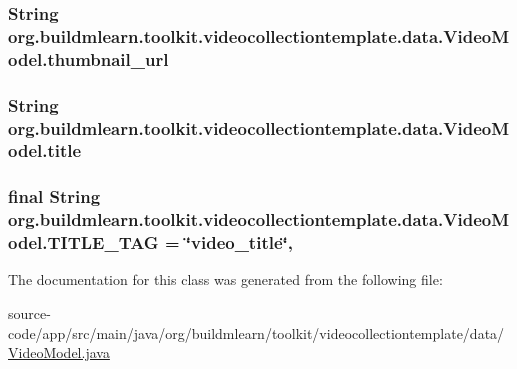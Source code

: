 \subsubsection[{\texorpdfstring{thumbnail\+\_\+url}{thumbnail_url}}]{\setlength{\rightskip}{0pt plus 5cm}String org.\+buildmlearn.\+toolkit.\+videocollectiontemplate.\+data.\+Video\+Model.\+thumbnail\+\_\+url\hspace{0.3cm}{\ttfamily [private]}}\hypertarget{classorg_1_1buildmlearn_1_1toolkit_1_1videocollectiontemplate_1_1data_1_1VideoModel_a5bad887870c101bb17b14850fa63d24b}{}\label{classorg_1_1buildmlearn_1_1toolkit_1_1videocollectiontemplate_1_1data_1_1VideoModel_a5bad887870c101bb17b14850fa63d24b}
\subsubsection[{\texorpdfstring{title}{title}}]{\setlength{\rightskip}{0pt plus 5cm}String org.\+buildmlearn.\+toolkit.\+videocollectiontemplate.\+data.\+Video\+Model.\+title\hspace{0.3cm}{\ttfamily [private]}}\hypertarget{classorg_1_1buildmlearn_1_1toolkit_1_1videocollectiontemplate_1_1data_1_1VideoModel_a58bad1c15baf40c7e0f34ba212ef2fc8}{}\label{classorg_1_1buildmlearn_1_1toolkit_1_1videocollectiontemplate_1_1data_1_1VideoModel_a58bad1c15baf40c7e0f34ba212ef2fc8}
\subsubsection[{\texorpdfstring{T\+I\+T\+L\+E\+\_\+\+T\+AG}{TITLE_TAG}}]{\setlength{\rightskip}{0pt plus 5cm}final String org.\+buildmlearn.\+toolkit.\+videocollectiontemplate.\+data.\+Video\+Model.\+T\+I\+T\+L\+E\+\_\+\+T\+AG = \char`\"{}video\+\_\+title\char`\"{}\hspace{0.3cm}{\ttfamily [static]}, {\ttfamily [private]}}\hypertarget{classorg_1_1buildmlearn_1_1toolkit_1_1videocollectiontemplate_1_1data_1_1VideoModel_a5615a39b6f341a11869ca7749ab8fdb4}{}\label{classorg_1_1buildmlearn_1_1toolkit_1_1videocollectiontemplate_1_1data_1_1VideoModel_a5615a39b6f341a11869ca7749ab8fdb4}


The documentation for this class was generated from the following file\+:\begin{DoxyCompactItemize}
\item 
source-\/code/app/src/main/java/org/buildmlearn/toolkit/videocollectiontemplate/data/\hyperlink{videocollectiontemplate_2data_2VideoModel_8java}{Video\+Model.\+java}\end{DoxyCompactItemize}
